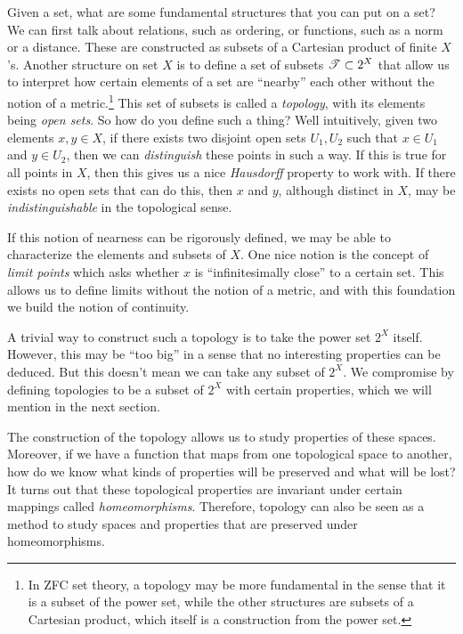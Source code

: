 Given a set, what are some fundamental structures that you can put on a set? We can first talk about relations, such as ordering, or functions, such as a norm or a distance. These are constructed as subsets of a Cartesian product of finite $X$'s. Another structure on set $X$ is to define a set of subsets $\operatorname{\mathscr{T}} \subset 2^X$ that allow us to interpret how certain elements of a set are ``nearby'' each other without the notion of a metric.\footnote{In ZFC set theory, a topology may be more fundamental in the sense that it is a subset of the power set, while the other structures are subsets of a Cartesian product, which itself is a construction from the power set.} This set of subsets is called a \textit{topology}, with its elements being \textit{open sets}. So how do you define such a thing? Well intuitively, given two elements $x, y \in X$, if there exists two disjoint open sets $U_1, U_2$ such that $x \in U_1$ and $y \in U_2$, then we can \textit{distinguish} these points in such a way. If this is true for all points in $X$, then this gives us a nice \textit{Hausdorff} property to work with. If there exists no open sets that can do this, then $x$ and $y$, although distinct in $X$, may be \textit{indistinguishable} in the topological sense. 

If this notion of nearness can be rigorously defined, we may be able to characterize the elements and subsets of $X$. One nice notion is the concept of \textit{limit points} which asks whether $x$ is ``infinitesimally close'' to a certain set. This allows us to define limits without the notion of a metric, and with this foundation we build the notion of continuity.    

A trivial way to construct such a topology is to take the power set $2^X$ itself. However, this may be ``too big'' in a sense that no interesting properties can be deduced. But this doesn't mean we can take any subset of $2^X$. We compromise by defining topologies to be a subset of $2^X$ with certain properties, which we will mention in the next section. 

The construction of the topology allows us to study properties of these spaces. Moreover, if we have a function that maps from one topological space to another, how do we know what kinds of properties will be preserved and what will be lost? It turns out that these topological properties are invariant under certain mappings called \textit{homeomorphisms}. Therefore, topology can also be seen as a method to study spaces and properties that are preserved under homeomorphisms. 
